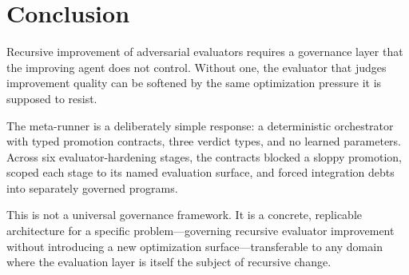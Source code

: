 \documentclass[11pt]{article}
\begin{document}
\section{Conclusion}

Recursive improvement of adversarial evaluators requires a governance layer that the improving agent does not control. Without one, the evaluator that judges improvement quality can be softened by the same optimization pressure it is supposed to resist.

The meta-runner is a deliberately simple response: a deterministic orchestrator with typed promotion contracts, three verdict types, and no learned parameters. Across six evaluator-hardening stages, the contracts blocked a sloppy promotion, scoped each stage to its named evaluation surface, and forced integration debts into separately governed programs.

This is not a universal governance framework. It is a concrete, replicable architecture for a specific problem---governing recursive evaluator improvement without introducing a new optimization surface---transferable to any domain where the evaluation layer is itself the subject of recursive change.




\end{document}
